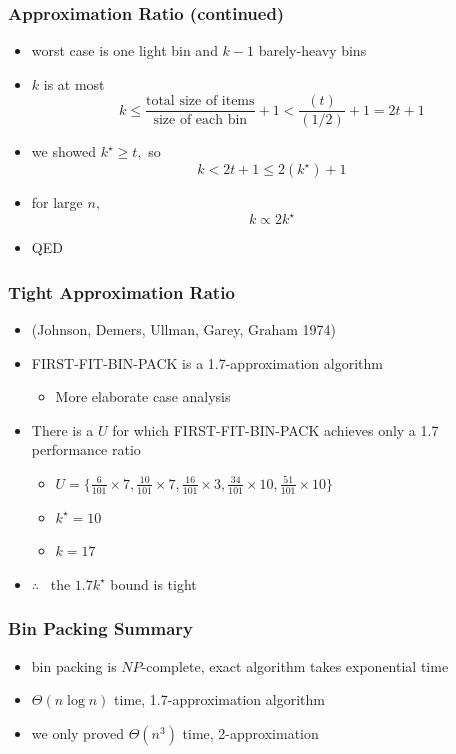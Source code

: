 \documentclass{beamer}
\begin{document}
\begin{frame} \frametitle{Approximation Ratio (continued)}
  \begin{itemize}
    \item worst case is one light bin and $k-1$ barely-heavy bins
    \item $k$ is at most
      \[ k \leq \frac{\text{total size of items}}{\text{size of each bin}} + 1 < \frac{(t)}{(1/2)} + 1 = 2t+1 \]
    \item we showed $k^\star \geq t,$ so
      \[ k < 2t+1 \leq 2(k^\star)+1 \]
    \item for large $n,$
      \[ k \propto 2 k^\star \]
    \item QED
  \end{itemize}
\end{frame}
    
\begin{frame} \frametitle{Tight Approximation Ratio}
  \begin{itemize}
    \item (Johnson, Demers, Ullman, Garey, Graham 1974)
    \item FIRST-FIT-BIN-PACK is a 1.7-approximation algorithm
    \begin{itemize}
      \item More elaborate case analysis
    \end{itemize}
    \item There is a $U$ for which FIRST-FIT-BIN-PACK achieves only a 1.7 performance ratio
    \begin{itemize}
      \item $U = \{ \frac{6}{101} \times 7, \frac{10}{101} \times 7, \frac{16}{101} \times 3, \frac{34}{101} \times 10, \frac{51}{101} \times 10 \}$
      \item $k^\star = 10$
      \item $k = 17$
    \end{itemize}
    \item $\therefore \enspace$ the $1.7 k^\star$ bound is tight
  \end{itemize}
\end{frame}

\begin{frame} \frametitle{Bin Packing Summary}
\begin{itemize}
  \item bin packing is $NP$-complete, exact algorithm takes exponential time
  \item $\Theta(n \log n)$ time, 1.7-approximation algorithm
  \item we only proved $\Theta(n^3)$ time, 2-approximation
\end{itemize}
\end{frame}
\end{document}
